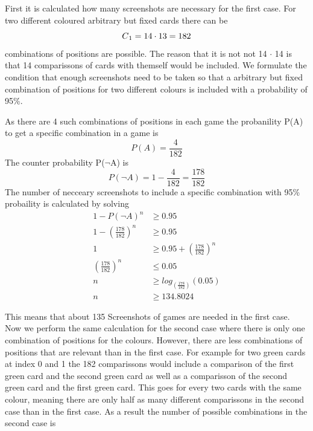 First it is calculated how many screenshots are necessary for the first case. For two different coloured arbitrary but fixed cards there can be 
\begin{equation*}
C\textsubscript{1} = 14 \cdot 13 = 182 
\end{equation*}
combinations of positions are possible. The reason that it is not not 14 $\cdot$ 14 is that 14 comparissons of cards with themself would be included. We formulate the condition that enough screenshots need to be taken so that a arbitrary but fixed combination of positions for two different colours is included with a probability of 95\%. 

\begin{center}
	As there are 4 such combinations of positions in each game the probanility P(A) to get a specific combination in a game is 
	\begin{equation*}
	P(A) = \frac{4}{182} %
	\end{equation*}
	The counter probability P($\lnot$A) is 
	\begin{equation*}
	P(\lnot A) = 1 - \frac{4}{182} = \frac{178}{182}%
	\end{equation*}
	The number of necceary screenshots to include a specific combination with 95\% probaility is calculated by solving
	\begin{align*}
	1 - P(\lnot A)^n &\geq 0.95 \\
	1 - \left(\frac{178}{182}\right)^n &\geq 0.95 \\
	1 &\geq 0.95 + \left(\frac{178}{182}\right)^n\\
	\left(\frac{178}{182}\right)^n &\leq 0.05\\
	n &\geq log_{(\frac{178}{182})}(0.05) \\
	n &\geq 134.8024 %
	\end{align*}
\end{center}
This means that about 135 Screenshots of games are needed in the first case. Now we perform the same calculation for the second case where there is only one combination of positions for the colours. However, there are less combinations of positions that are relevant than in the first case. For example for two green cards at index 0 and 1 the 182 comparissons would include a comparison of the first green card and the second green card as well as a comparisson of the second green card and the first green card. This goes for every two cards with the same colour, meaning there are only half as many different comparissons in the second case than in the first case. As a result the number of possible combinations in the second case is
